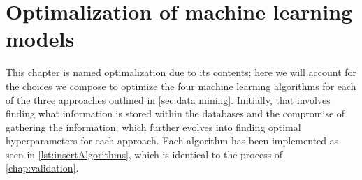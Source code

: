 \chapter{Optimalization of machine learning models}

This chapter is named optimalization due to its contents; here we will account for the choices we compose to optimize the four machine learning algorithms for each of the three approaches outlined in \autoref{sec:data mining}. Initially, that involves finding what information is stored within the databases and the compromise of gathering the information, which further evolves into finding optimal hyperparameters for each approach. Each algorithm has been implemented as seen in \ref{lst:insertAlgorithms}, which is identical to the process of \autoref{chap:validation}.


